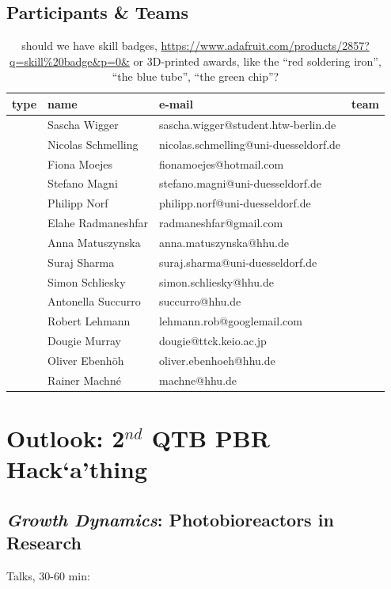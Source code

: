 \documentclass[12pt,a4paper]{scrartcl}
\newcommand{\hack}[0]{Hack`a'thing}
\begin{document}
\subsection{Participants \& Teams}

\begin{table}[ht!]
  \begin{tabular}{lllc}
    \bf type & \bf name & \bf e-mail & \bf team \\\hline
    & Sascha Wigger & sascha.wigger@student.htw-berlin.de&\\
    & Nicolas Schmelling & nicolas.schmelling@uni-duesseldorf.de&\\
    & Fiona Moejes & fionamoejes@hotmail.com &\\
    & Stefano Magni & stefano.magni@uni-duesseldorf.de&\\
    & Philipp Norf & philipp.norf@uni-duesseldorf.de&\\
    & Elahe Radmaneshfar & radmaneshfar@gmail.com&\\
    & Anna Matuszynska & anna.matuszynska@hhu.de&\\
    & Suraj Sharma & suraj.sharma@uni-duesseldorf.de&\\
    & Simon Schliesky & simon.schliesky@hhu.de&\\
    & Antonella Succurro & succurro@hhu.de& \\
    & Robert Lehmann & lehmann.rob@googlemail.com &\\
    & Dougie Murray & dougie@ttck.keio.ac.jp&\\
    & Oliver Ebenh\"oh & oliver.ebenhoeh@hhu.de& \\
    & Rainer Machn\'e & machne@hhu.de& 
  \end{tabular}
  \caption[]{should we have skill badges, \url{https://www.adafruit.com/products/2857?q=skill\%20badge&p=0&} or 3D-printed awards, like the ``red soldering iron'', ``the blue tube'', ``the green chip''?}
\end{table}

\section{Outlook: 2$^{nd}$ QTB PBR \hack{}}

\subsection{\textit{Growth Dynamics}: Photobioreactors in Research}

Talks, 30-60 min:
\end{document}
